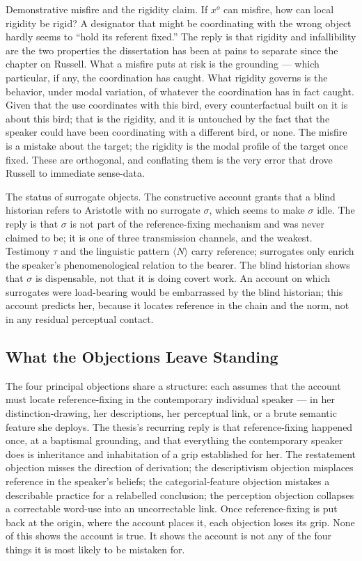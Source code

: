 \documentclass[12pt,a4paper]{article}
\begin{document}
Demonstrative misfire and the rigidity claim. If \(x^o\) can misfire, how can local rigidity be rigid? A designator that might be coordinating with the wrong object hardly seems to ``hold its referent fixed.'' The reply is that rigidity and infallibility are the two properties the dissertation has been at pains to separate since the chapter on Russell. What a misfire puts at risk is the grounding --- which particular, if any, the coordination has caught. What rigidity governs is the behavior, under modal variation, of whatever the coordination has in fact caught. Given that the use coordinates with this bird, every counterfactual built on it is about this bird; that is the rigidity, and it is untouched by the fact that the speaker could have been coordinating with a different bird, or none. The misfire is a mistake about the target; the rigidity is the modal profile of the target once fixed. These are orthogonal, and conflating them is the very error that drove Russell to immediate sense-data.

The status of surrogate objects. The constructive account grants that a blind historian refers to Aristotle with no surrogate \(\sigma\), which seems to make \(\sigma\) idle. The reply is that \(\sigma\) is not part of the reference-fixing mechanism and was never claimed to be; it is one of three transmission channels, and the weakest. Testimony \(\tau\) and the linguistic pattern \(\langle N \rangle\) carry reference; surrogates only enrich the speaker's phenomenological relation to the bearer. The blind historian shows that \(\sigma\) is dispensable, not that it is doing covert work. An account on which surrogates were load-bearing would be embarrassed by the blind historian; this account predicts her, because it locates reference in the chain and the norm, not in any residual perceptual contact.

\subsection{What the Objections Leave Standing}\label{what-the-objections-leave-standing}

The four principal objections share a structure: each assumes that the account must locate reference-fixing in the contemporary individual speaker --- in her distinction-drawing, her descriptions, her perceptual link, or a brute semantic feature she deploys. The thesis's recurring reply is that reference-fixing happened once, at a baptismal grounding, and that everything the contemporary speaker does is inheritance and inhabitation of a grip established for her. The restatement objection misses the direction of derivation; the descriptivism objection misplaces reference in the speaker's beliefs; the categorial-feature objection mistakes a describable practice for a relabelled conclusion; the perception objection collapses a correctable word-use into an uncorrectable link. Once reference-fixing is put back at the origin, where the account places it, each objection loses its grip. None of this shows the account is true. It shows the account is not any of the four things it is most likely to be mistaken for.
\end{document}
